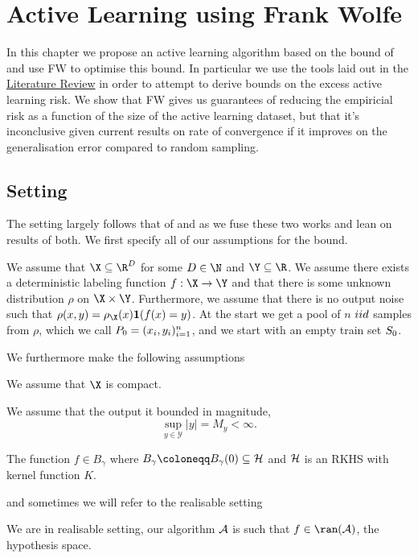 \chapter{Active Learning using Frank Wolfe}
\label{ch:methodology}
In this chapter we propose an active learning algorithm based on the bound of
\cite{viering17_nuclear_discr_activ_learn} and use FW to optimise this bound. In
particular we use the tools laid out in the \hyperref[ch:lit-rev]{Literature Review}
in order to attempt to derive bounds on the excess active learning risk.
We show that FW gives us guarantees of reducing the empiricial risk as a
function of the size of the active learning dataset, but that it's inconclusive
given current results on rate of convergence if it improves on the
generalisation error compared to random sampling.

\section{Setting}
The setting largely follows that of \cite{viering17_nuclear_discr_activ_learn} and
\cite{bach12_equiv_between_herdin_condit_gradien_algor} as we fuse these two works and
lean on results of both. We first specify all of our assumptions for the bound.

\begin{assumption}
  \label{as:al-fw}
  We assume that \(\X \subseteq \R^{D}\) for some \(D \in \N\) and \(\Y \subseteq
  \R\). We assume there exists a deterministic labeling function \(f : \X \to
  \Y\) and that there is some unknown distribution \(\rho\) on \(\X \times \Y\).
  Furthermore, we assume that there is no output noise such that \(\rho(x, y) = \rho_{\X}(x)\mathbf{1}(f(x) =
  y)\). At the start we get a pool of \(n\) \(iid\) samples from \(\rho\), which we
  call \(P_{0} = (x_{i}, y_{i})_{i=1}^{n}\), and we start with an empty train
  set \(S_{0}\).
\end{assumption}
We furthermore make the following assumptions
\begin{assumption}
  \label{as:domain-is-compact}
  We assume that \(\X\) is compact.
\end{assumption}
\begin{assumption}
  We assume that the output it bounded in magnitude,
  \label{as:output-bounded}
  \begin{equation*}
    \sup_{y \in \mathcal{Y}}|y| = M_y < \infty.
  \end{equation*}
\end{assumption}
\begin{assumption}
  \label{as:f-in-gamma-ball}
  The function \(f \in B_{\gamma}\) where \(B_{\gamma} \coloneqq B_{\gamma}(0) \subseteq \rkhs{H}\) and \(\mathcal{H}\) is an RKHS with kernel function \(K\).
\end{assumption}
and sometimes we will refer to the realisable setting
\begin{assumption}
  \label{as:realisable-setting}
  We are in realisable setting, our algorithm \(\mathcal{A}\) is such that \(f \in
  \ran(\algo)\), the hypothesis space.
\end{assumption}

